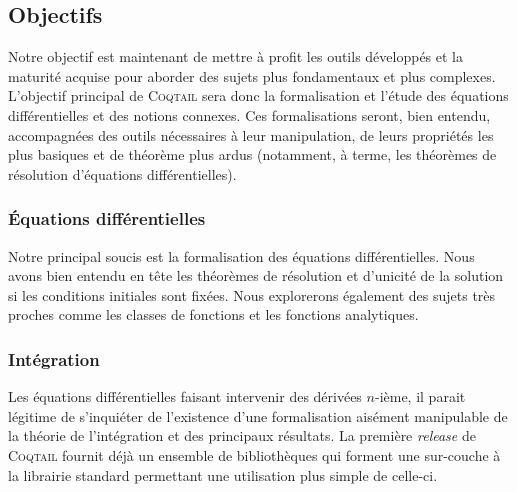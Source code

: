 \documentclass[11pt]{article}
\newcommand{\coqtail}{\textsc{Coqtail}}
\begin{document}
\subsection{Objectifs}

Notre objectif est maintenant de mettre à profit les outils développés et la maturité acquise pour aborder des sujets plus fondamentaux et plus complexes. L'objectif principal de \coqtail{} sera donc la formalisation et l'étude des équations différentielles et des notions connexes. Ces formalisations seront, bien entendu, accompagnées des outils nécessaires à leur manipulation, de leurs propriétés les plus basiques et de théorème plus ardus (notamment, à terme, les théorèmes de résolution d'équations différentielles).

\subsubsection{Équations différentielles}

Notre principal soucis est la formalisation des équations différentielles. Nous avons bien entendu en tête les théorèmes de résolution et d'unicité de la solution si les conditions initiales sont fixées. Nous explorerons également des sujets très proches comme les classes de fonctions et les fonctions analytiques.

\subsubsection{Intégration}

Les équations différentielles faisant intervenir des dérivées $n$-ième, il parait légitime de s'inquiéter de l'existence d'une formalisation aisément manipulable de la théorie de l'intégration et des principaux résultats. La première \textit{release} de \coqtail{} fournit déjà un ensemble de bibliothèques qui forment une sur-couche à la librairie standard permettant une utilisation plus simple de celle-ci.
\end{document}
